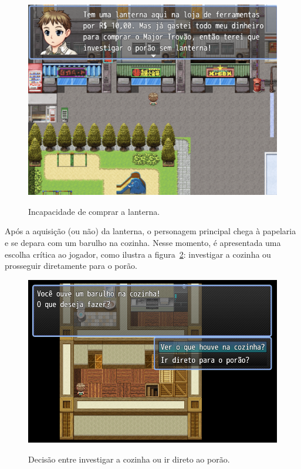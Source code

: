 \begin{figure}[!htbp]
	\centering
	\caption{Incapacidade de comprar a lanterna.}
	\includegraphics[scale=0.4]{Textuais/Pictures/nao-compra-lanterna.png}
	\label{fig:nao-compra-lanterna}
\end{figure}

Após a aquisição (ou não) da lanterna, o personagem principal chega à papelaria e se depara com um barulho na cozinha. Nesse momento, é apresentada uma escolha crítica ao jogador, como ilustra a figura~\ref{fig:chega-cozinha-papelaria}: investigar a cozinha ou prosseguir diretamente para o porão.

\begin{figure}[!htbp]
	\centering
	\caption{Decisão entre investigar a cozinha ou ir direto ao porão.}
	\includegraphics[scale=0.45]{Textuais/Pictures/chega-cozinha-papelaria.png}
	\label{fig:chega-cozinha-papelaria}
\end{figure}

